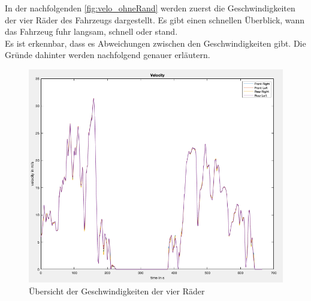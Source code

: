 	In der nachfolgenden \autoref{fig:velo_ohneRand} werden zuerst die Geschwindigkeiten der vier Räder des Fahrzeugs dargestellt. Es gibt einen schnellen Überblick, wann das Fahrzeug fuhr langsam, schnell oder stand. \\
	Es ist erkennbar, dass es Abweichungen zwischen den Geschwindigkeiten gibt. Die Gründe dahinter werden nachfolgend genauer erläutern.
	\begin{figure}[h!]
		\centering
		\includegraphics[width=1\linewidth]{../Graphiken/velo_ohneRand}
		\caption{Übersicht der Geschwindigkeiten der vier Räder}
		\label{fig:velo_ohneRand}
	\end{figure}
\pagebreak





